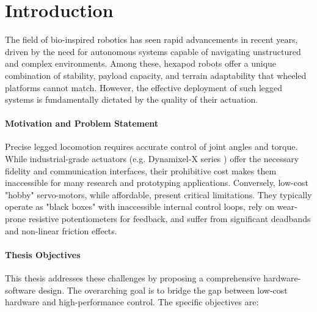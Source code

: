 \chapter{Introduction}

The field of bio-inspired robotics \cite{delcomyn2004insect} has seen rapid advancements in recent years,
\cite{chai2022survey,fan2024review} driven by the need for autonomous systems capable of navigating
unstructured and complex environments. Among these, hexapod robots offer a unique combination of stability,
payload capacity, and terrain adaptability that wheeled platforms cannot match. However, the effective deployment
of such legged systems is fundamentally dictated by the quality of their actuation.


\subsubsection{Motivation and Problem Statement}

Precise legged locomotion requires accurate control of joint angles and torque. While industrial-grade actuators
(e.g. Dynamixel-X series \cite{robotis_dynamixel_x}) offer the necessary fidelity and communication interfaces,
their prohibitive cost makes them inaccessible for many research and prototyping applications. Conversely,
low-cost "hobby" servo-motors, while affordable, present critical limitations. They typically operate as
"black boxes" with inaccessible internal control loops, rely on wear-prone resistive potentiometers for feedback,
and suffer from significant deadbands and non-linear friction effects.


\subsubsection{Thesis Objectives}

This thesis addresses these challenges by proposing a comprehensive hardware-software design. The overarching goal
is to bridge the gap between low-cost hardware and high-performance control. The specific objectives are:

